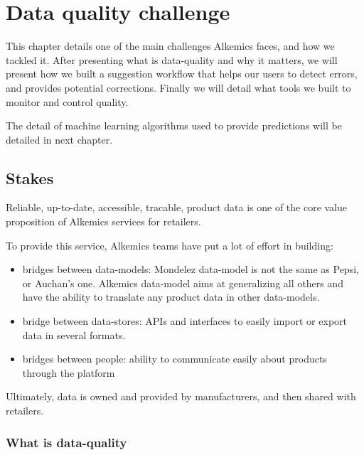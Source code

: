 \chapter{Data quality challenge}

This chapter details one of the main challenges Alkemics faces, and how we tackled it. 
After presenting what is data-quality and why it matters, we will present how we built a suggestion workflow that helps our users to detect errors, and provides potential corrections. Finally we will detail what tools we built to monitor and control quality.

The detail of machine learning algorithms used to provide predictions will be detailed in next chapter.

\section{Stakes}

Reliable, up-to-date, accessible, tracable, product data is one of the core value proposition of Alkemics services for retailers.

To provide this service, Alkemics teams have put a lot of effort in building:

\begin{itemize}
	\item bridges between data-models: Mondelez data-model is not the same as Pepsi, or Auchan's one. Alkemics data-model aims at generalizing all others and have the ability to translate any product data in other data-models.
	\item bridge between data-stores: APIs and interfaces to easily import or export data in several formats.
	\item bridges between people: ability to communicate easily about products through the platform
\end{itemize} 

Ultimately, data is owned and provided by manufacturers, and then shared with retailers.

\subsection{What is data-quality}

